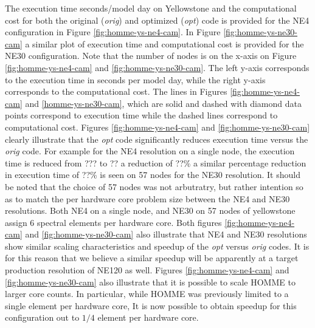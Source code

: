 
The execution time seconds/model day on Yellowstone and the computational cost for both the original ({\em orig})  and optimized ({\em opt}) code is provided for the NE4 configuration in Figure \ref{fig:homme-ys-ne4-cam}. In Figure \ref{fig:homme-ys-ne30-cam} a similar plot of execution time and computational cost is provided for the NE30 configuration.  Note that the number of nodes is on the x-axis on Figure \ref{fig:homme-ys-ne4-cam} and \ref{fig:homme-ys-ne30-cam}.  The left y-axis corresponds to the execution time in seconds per model day, while the right y-axis corresponds to the computational cost. The lines in Figures \ref{fig:homme-ys-ne4-cam} and \ref{homme-ys-ne30-cam}, which are solid and dashed with diamond data points correspond to execution time while the dashed lines  correspond to computational cost.  Figures  \ref{fig:homme-ys-ne4-cam} and \ref{fig:homme-ys-ne30-cam} clearly illustrate that the {\em opt} code significantly reduces execution time versus the {\em orig} code.  For example for the NE4 resolution on a single node, the execution time is reduced from ??? to ?? a reduction of ??\% a similar percentage reduction in execution time of ??\% is seen on 57 nodes for the NE30 resolution.  It should be  noted that the choice of 57 nodes was not arbutratry, but rather intention so as to match the per hardware core problem size between the NE4 and NE30 resolutions.  Both  NE4 on a single node, and NE30 on 57 nodes of yellowstone assign 6 spectral elements per hardware core.  Both figures \ref{fig:homme-ys-ne4-cam} and \ref{fig:homme-ys-ne30-cam} also illustrate that NE4 and NE30 resolutions show similar scaling characteristics and speedup of the {\em opt} versus {\em orig} codes. It is for this reason that we believe a similar speedup will be apparently at a target production resolution of NE120 as well.   Figures \ref{fig:homme-ys-ne4-cam} and \ref{fig:homme-ys-ne30-cam} also illustrate that it is possible to scale HOMME to larger core counts.  In particular, while HOMME was previously limited to a single element per hardware core, It is now possible to obtain speedup for this configuration out to $1/4$ element per hardware core.
 
